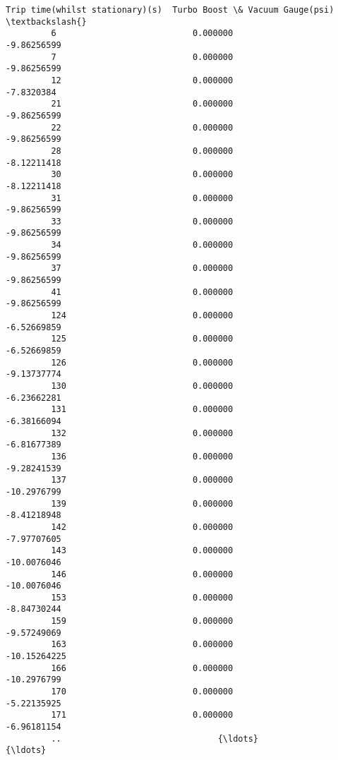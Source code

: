 \documentclass[11pt]{article}
\begin{document}
\begin{Verbatim}[commandchars=\\\{\}]
              Trip time(whilst stationary)(s)  Turbo Boost \& Vacuum Gauge(psi)  \textbackslash{}
         6                           0.000000                      -9.86256599   
         7                           0.000000                      -9.86256599   
         12                          0.000000                       -7.8320384   
         21                          0.000000                      -9.86256599   
         22                          0.000000                      -9.86256599   
         28                          0.000000                      -8.12211418   
         30                          0.000000                      -8.12211418   
         31                          0.000000                      -9.86256599   
         33                          0.000000                      -9.86256599   
         34                          0.000000                      -9.86256599   
         37                          0.000000                      -9.86256599   
         41                          0.000000                      -9.86256599   
         124                         0.000000                      -6.52669859   
         125                         0.000000                      -6.52669859   
         126                         0.000000                      -9.13737774   
         130                         0.000000                      -6.23662281   
         131                         0.000000                      -6.38166094   
         132                         0.000000                      -6.81677389   
         136                         0.000000                      -9.28241539   
         137                         0.000000                      -10.2976799   
         139                         0.000000                      -8.41218948   
         142                         0.000000                      -7.97707605   
         143                         0.000000                      -10.0076046   
         146                         0.000000                      -10.0076046   
         153                         0.000000                      -8.84730244   
         159                         0.000000                      -9.57249069   
         163                         0.000000                     -10.15264225   
         166                         0.000000                      -10.2976799   
         170                         0.000000                      -5.22135925   
         171                         0.000000                      -6.96181154   
         ..                               {\ldots}                              {\ldots}   

\end{Verbatim}
\end{document}
